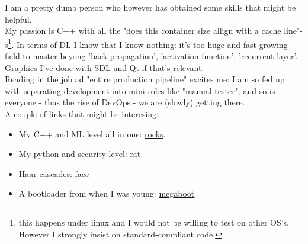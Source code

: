 \documentclass{article}
\begin{document}
I am a pretty dumb person who however has obtained some skills that might be helpful.  \\

My passion is C++ with all the "does this container size allign with a cache line"-s\footnote{this happens under linux and I would not be willing to test on other OS's. However I strongly insist on standard-compliant code.}.
In terms of DL I know that I know nothing: it's too huge and fast growing field to master beyong 'back propagation', 'activation function', 'recurrent layer'.
Graphics I've done with SDL and Qt if that's relevant.  \\

Reading in the job ad "entire production pipeline" excites me: I am so fed up with separating development into mini-roles like "manual tester"; and so is everyone - thus the rise of DevOps - we are (slowly) getting there.  \\

A couple of links that might be interesing:  \\
\begin{itemize}
\item{My C++ and ML level all in one: {\href{https://github.com/MiroslavVitkov/rocks}{rocks}}.}
\item{My python and security level: {\href{https://github.com/MiroslavVitkov/rat}{rat}}}
\item{Haar cascades: {\href{https://github.com/MiroslavVitkov/face}{face}}}
\item{A bootloader from when I was young: {\href{https://github.com/MiroslavVitkov/megaboot}{megaboot}}}
\end{itemize}
\end{document}
